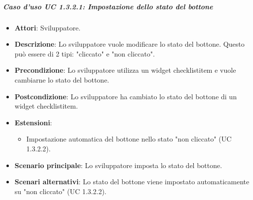 \subparagraph{Caso d'uso UC 1.3.2.1: Impostazione dello stato del bottone}
\label{UC 1.3.2.1: Impostare lo stato del bottone}
\FloatBarrier
\begin{itemize}
\item\textbf{Attori}: Sviluppatore.
\item\textbf{Descrizione}: Lo sviluppatore vuole modificare lo stato del bottone. Questo può essere di 2 tipi: "cliccato" e "non cliccato".
\item\textbf{Precondizione}: Lo sviluppatore utilizza un widget checklistitem e vuole cambiarne lo stato del bottone.
\item\textbf{Postcondizione}: Lo sviluppatore ha cambiato lo stato del bottone di un widget checklistitem.
\item\textbf{Estensioni}: 
\begin{itemize}
\item Impostazione automatica del bottone nello stato "non cliccato" (UC 1.3.2.2).
\end{itemize}
\item\textbf{Scenario principale}: Lo sviluppatore imposta lo stato del bottone.
\item\textbf{Scenari alternativi}: Lo stato del bottone viene impostato automaticamente su "non cliccato" (UC 1.3.2.2).
\end{itemize}
